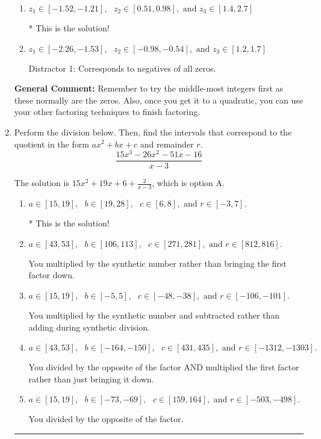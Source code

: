 \documentclass{extbook}[14pt]
\newcommand{\litem}[1]{\item #1

\rule{\textwidth}{0.4pt}}
\begin{document}
\begin{enumerate}
{\begin{enumerate}[label=\Alph*.]
 Distractor 4: Corresponds to moving factors from one rational to another.
\item \( z_1 \in [-1.52, -1.21], \text{   }  z_2 \in [0.51, 0.98], \text{   and   } z_3 \in [1.4, 2.7] \)

* This is the solution!
\item \( z_1 \in [-2.26, -1.53], \text{   }  z_2 \in [-0.98, -0.54], \text{   and   } z_3 \in [1.2, 1.7] \)

 Distractor 1: Corresponds to negatives of all zeros.
\end{enumerate}

\textbf{General Comment:} Remember to try the middle-most integers first as these normally are the zeros. Also, once you get it to a quadratic, you can use your other factoring techniques to finish factoring.
}
\litem{
Perform the division below. Then, find the intervals that correspond to the quotient in the form $ax^2+bx+c$ and remainder $r$.
\[ \frac{15x^{3} -26 x^{2} -51 x -16}{x -3} \]

The solution is \( 15x^{2} +19 x + 6 + \frac{2}{x -3} \), which is option A.\begin{enumerate}[label=\Alph*.]
\item \( a \in [15, 19], \text{   } b \in [19, 28], \text{   } c \in [6, 8], \text{   and   } r \in [-3, 7]. \)

* This is the solution!
\item \( a \in [43, 53], \text{   } b \in [106, 113], \text{   } c \in [271, 281], \text{   and   } r \in [812, 816]. \)

 You multiplied by the synthetic number rather than bringing the first factor down.
\item \( a \in [15, 19], \text{   } b \in [-5, 5], \text{   } c \in [-48, -38], \text{   and   } r \in [-106, -101]. \)

 You multiplied by the synthetic number and subtracted rather than adding during synthetic division.
\item \( a \in [43, 53], \text{   } b \in [-164, -150], \text{   } c \in [431, 435], \text{   and   } r \in [-1312, -1303]. \)

 You divided by the opposite of the factor AND multiplied the first factor rather than just bringing it down.
\item \( a \in [15, 19], \text{   } b \in [-73, -69], \text{   } c \in [159, 164], \text{   and   } r \in [-503, -498]. \)

 You divided by the opposite of the factor.
\end{enumerate}

}
\end{enumerate}
\end{document}
